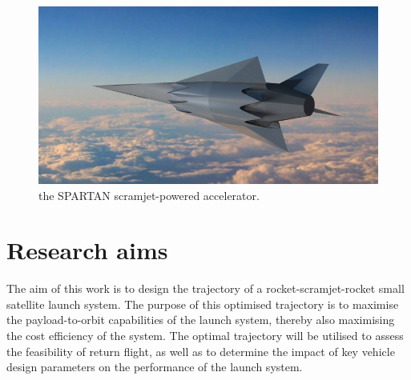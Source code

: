   	  	\begin{figure}[ht]
  	  		\centering
  	  		\includegraphics[width=0.7\linewidth]{figures/1_introduction/project-spartan}
  	  		\caption{the SPARTAN scramjet-powered accelerator\cite{BBC}.}
  	  		\label{fig:project-spartan}
  	  	\end{figure}
  	  	
  	  	

  \section{Research aims}

    The aim of this work is to design the trajectory of a rocket-scramjet-rocket small satellite launch system. The purpose of this optimised trajectory is to maximise the payload-to-orbit capabilities of the launch system, thereby also maximising the cost efficiency of the system. The optimal trajectory will be utilised to assess the feasibility of return flight, as well as to determine the impact of key vehicle design parameters on the performance of the launch system. 
 
